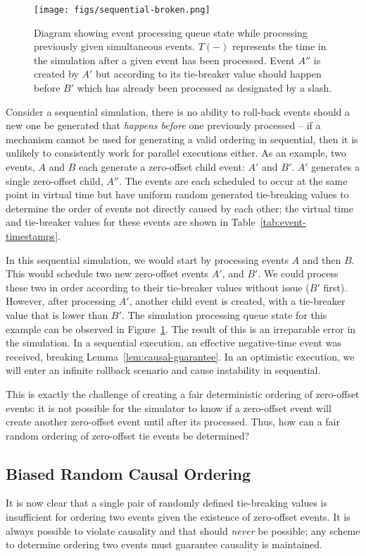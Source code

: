 \documentclass[nonacm,sigconf]{acmart}
\begin{document}
\begin{figure}
  \centering
  \texttt{[image: figs/sequential-broken.png]}
  \caption{Diagram showing event processing queue state while processing previously given simultaneous events. $T(-)$ represents the time in the simulation after a given event has been processed. Event $A''$ is created by $A'$ but according to its tie-breaker value should happen before $B'$ which has already been processed as designated by a slash.}\label{fig:sequential-broken}
\end{figure}

Consider a sequential simulation, there is no ability to roll-back events should a new one be generated that \emph{happens before} one previously processed -- if a mechanism cannot be used for generating a valid ordering in sequential, then it is unlikely to consistently work for parallel executions either. As an example, two events, $A$ and $B$ each generate a zero-offset child event: $A'$ and $B'$. $A'$ generates a single zero-offset child, $A''$. The events are each scheduled to occur at the same point in virtual time but have uniform random generated tie-breaking values to determine the order of events not directly caused by each other; the virtual time and tie-breaker values for these events are shown in Table~\ref{tab:event-timestamps}.

In this sequential simulation, we would start by processing events $A$ and then $B$. This would schedule two new zero-offset events $A'$, and $B'$. We could process these two in order according to their tie-breaker values without issue ($B'$ first). However, after processing $A'$, another child event is created, with a tie-breaker value that is lower than $B'$. The simulation processing queue state for this example can be observed in Figure~\ref{fig:sequential-broken}. The result of this is an irreparable error in the simulation. In a sequential execution, an effective negative-time event was received, breaking Lemma~\ref{lem:causal-guarantee}. In an optimistic execution, we will enter an infinite rollback scenario and cause instability in sequential.

This is exactly the challenge of creating a fair deterministic ordering of zero-offset events: it is not possible for the simulator to know if a zero-offset event will create another zero-offset event until after its processed. Thus, how can a fair random ordering of zero-offset tie events be determined?

\subsection{Biased Random Causal Ordering}\label{sec:biased-random}
It is now clear that a single pair of randomly defined tie-breaking values is insufficient for ordering two events given the existence of zero-offset events. It is always possible to violate causality and that should \emph{never} be possible; any scheme to determine ordering two events must guarantee causality is maintained.
\end{document}
